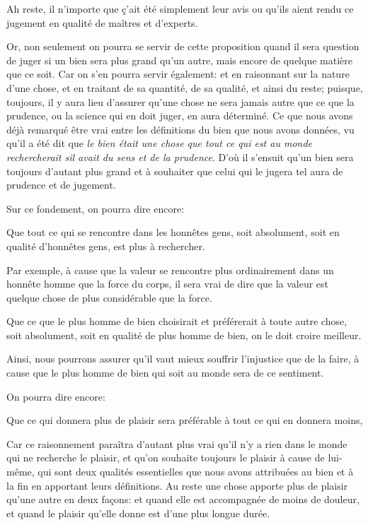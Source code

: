 Ah reste, il n'importe que ç'ait été simplement leur avis ou qu'ils aient rendu ce jugement en qualité de maîtres et d'experts.

Or, non seulement on pourra se servir de cette proposition quand il sera question de juger si un bien sera plus grand qu'un autre,
mais encore de quelque matière que ce soit. Car on s'en pourra servir également: et en raisonnant sur la nature d'une chose, et en
traitant de sa quantité, de sa qualité, et ainsi du reste; puisque, toujours, il y aura lieu d’assurer qu'une chose ne sera jamais
autre que ce que la prudence, ou la science qui en doit juger, en aura déterminé. Ce que nous avons déjà remarqué être vrai entre
les définitions du bien que nous avons données, vu qu'il a été dit que \emph{le bien était une chose que tout ce qui est au monde
rechercherait sil avait du sens et de la prudence}. D'où il s'ensuit qu'un bien sera toujours d'autant plus grand et à souhaiter
que celui qui le jugera tel aura de prudence et de jugement.

\bigbreak

Sur ce fondement, on pourra dire encore:

\begin{lieu}
	Que tout ce qui se rencontre dans les honnêtes gens, soit absolument, soit en qualité d’honnêtes gens, est plus à rechercher.
\end{lieu}

Par exemple, à cause que la valeur se rencontre plus ordinairement dans un honnête homme que la force du corps, il sera vrai de
dire que la valeur est quelque chose de plus considérable que la force.

\bigbreak

\begin{lieu}
	Que ce que le plus homme de bien choisirait et préférerait à toute autre chose, soit absolument, soit en qualité de plus homme de
	bien, on le doit croire meilleur.
\end{lieu}

Ainsi, nous pourrons assurer qu'il vaut mieux souffrir l'injustice que de la faire, à cause que le plus homme de bien qui soit au monde
sera de ce sentiment.

On pourra dire encore:

\begin{lieu}
	Que ce qui donnera plus de plaisir sera préférable à tout ce qui en donnera moins,
\end{lieu}

Car ce raisonnement paraîtra d'autant plus vrai qu'il n'y a rien dans le monde qui ne recherche le plaisir, et qu'on souhaite
toujours le plaisir à cause de lui-même, qui sont deux qualités essentielles que nous avons attribuées au bien et à la fin en
apportant leurs définitions. Au reste une chose apporte plus de plaisir qu'une autre en deux façons: et quand elle est
accompagnée de moins de douleur, et quand le plaisir qu'elle donne est d'une plus longue durée.

